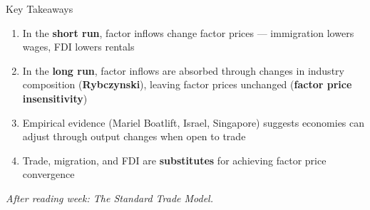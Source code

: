 \documentclass{beamer}
\begin{document}
\begin{frame}{Key Takeaways}

\begin{enumerate}
    \item In the \textbf{short run}, factor inflows change factor prices --- immigration lowers wages, FDI lowers rentals

    \vspace{0.2cm}

    \item In the \textbf{long run}, factor inflows are absorbed through changes in industry composition (\textbf{Rybczynski}), leaving factor prices unchanged (\textbf{factor price insensitivity})

    \vspace{0.2cm}

    \item Empirical evidence (Mariel Boatlift, Israel, Singapore) suggests economies can adjust through output changes when open to trade

    \vspace{0.2cm}

    \item Trade, migration, and FDI are \textbf{substitutes} for achieving factor price convergence
\end{enumerate}

\vspace{0.3cm}

\textit{After reading week: The Standard Trade Model.}

\end{frame}



\fi
\end{document}
